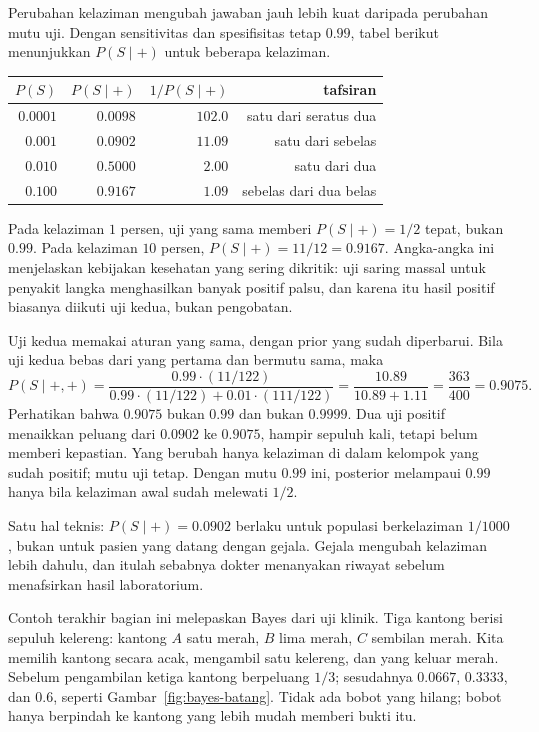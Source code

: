 Perubahan kelaziman mengubah jawaban jauh lebih kuat daripada perubahan mutu uji.
Dengan sensitivitas dan spesifisitas tetap $0.99$, tabel berikut menunjukkan
$P(S\mid +)$ untuk beberapa kelaziman.

\begin{center}
\small
\begin{tabular}{rrrr}
\hline
$P(S)$ & $P(S\mid +)$ & $1/P(S\mid +)$ & tafsiran \\
\hline
$0.0001$ & $0.0098$ & $102.0$ & satu dari seratus dua \\
$0.001$ & $0.0902$ & $11.09$ & satu dari sebelas \\
$0.010$ & $0.5000$ & $2.00$ & satu dari dua \\
$0.100$ & $0.9167$ & $1.09$ & sebelas dari dua belas \\
\hline
\end{tabular}
\end{center}

Pada kelaziman $1$ persen, uji yang sama memberi $P(S\mid+)=1/2$ tepat, bukan $0.99$.
Pada kelaziman $10$ persen, $P(S\mid+)=11/12=0.9167$. Angka-angka ini menjelaskan
kebijakan kesehatan yang sering dikritik: uji saring massal untuk penyakit langka
menghasilkan banyak positif palsu, dan karena itu hasil positif biasanya diikuti uji
kedua, bukan pengobatan.

Uji kedua memakai aturan yang sama, dengan prior yang sudah diperbarui. Bila uji kedua
bebas dari yang pertama dan bermutu sama, maka
\[
P(S\mid +,+)=\frac{0.99\cdot (11/122)}{0.99\cdot (11/122)+0.01\cdot (111/122)}
=\frac{10.89}{10.89+1.11}=\frac{363}{400}=0.9075 .
\]
Perhatikan bahwa $0.9075$ bukan $0.99$ dan bukan $0.9999$. Dua uji positif menaikkan
peluang dari $0.0902$ ke $0.9075$, hampir sepuluh kali, tetapi belum memberi kepastian.
Yang berubah hanya kelaziman di dalam kelompok yang sudah positif; mutu uji tetap. Dengan
mutu $0.99$ ini, posterior melampaui $0.99$ hanya bila kelaziman awal sudah melewati
$1/2$.

Satu hal teknis: $P(S\mid+)=0.0902$ berlaku untuk populasi berkelaziman $1/1000$, bukan
untuk pasien yang datang dengan gejala. Gejala mengubah kelaziman lebih dahulu, dan
itulah sebabnya dokter menanyakan riwayat sebelum menafsirkan hasil laboratorium.

Contoh terakhir bagian ini melepaskan Bayes dari uji klinik. Tiga kantong berisi sepuluh
kelereng: kantong $A$ satu merah, $B$ lima merah, $C$ sembilan merah. Kita memilih
kantong secara acak, mengambil satu kelereng, dan yang keluar merah. Sebelum pengambilan
ketiga kantong berpeluang $1/3$; sesudahnya $0.0667$, $0.3333$, dan $0.6$, seperti
Gambar~\ref{fig:bayes-batang}. Tidak ada bobot yang hilang; bobot hanya berpindah ke
kantong yang lebih mudah memberi bukti itu.

